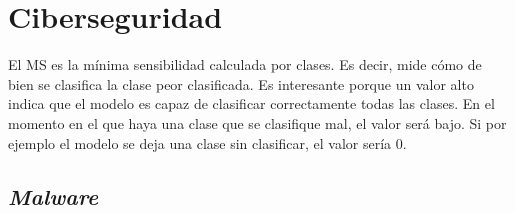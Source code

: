\section{Ciberseguridad}
\label{sec:ciberseguridad}

El MS es la mínima sensibilidad calculada por clases. Es decir, mide cómo de bien se clasifica la clase peor clasificada. Es interesante porque un valor alto indica que el modelo es capaz de clasificar correctamente todas las clases. En el momento en el que haya una clase que se clasifique mal, el valor será bajo. Si por ejemplo el modelo se deja una clase sin clasificar, el valor sería 0.

\subsection{\textit{Malware}}
\label{subsec:malware}


